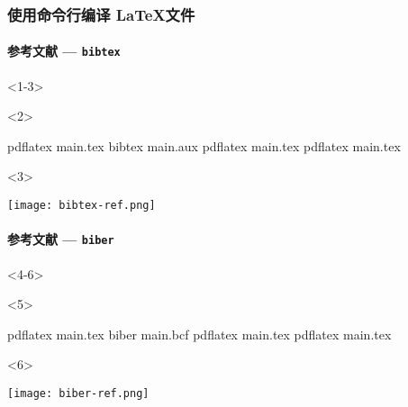 \begin{frame}[fragile, t]
  \frametitle{使用命令行编译 \LaTeX 文件}
  \framesubtitle<1-3>{参考文献 --- \texttt{bibtex}}

\begin{onlyenv}<1-3>
\end{onlyenv}

\begin{onlyenv}<2>
\begin{cmdcode}
pdflatex main.tex
bibtex main.aux
pdflatex main.tex
pdflatex main.tex
\end{cmdcode}  
\end{onlyenv}

\begin{onlyenv}<3>
  \begin{center}
    \texttt{[image: bibtex-ref.png]}
  \end{center}
\end{onlyenv}

\framesubtitle<4-6>{参考文献 --- \texttt{biber}}

\begin{onlyenv}<4-6>
\end{onlyenv}

\begin{onlyenv}<5>
  \begin{cmdcode}
  pdflatex main.tex
  biber main.bcf
  pdflatex main.tex
  pdflatex main.tex
  \end{cmdcode}  
  \end{onlyenv}
  
  \begin{onlyenv}<6>
    \begin{center}
      \texttt{[image: biber-ref.png]}
    \end{center}
  \end{onlyenv}

\end{frame}

